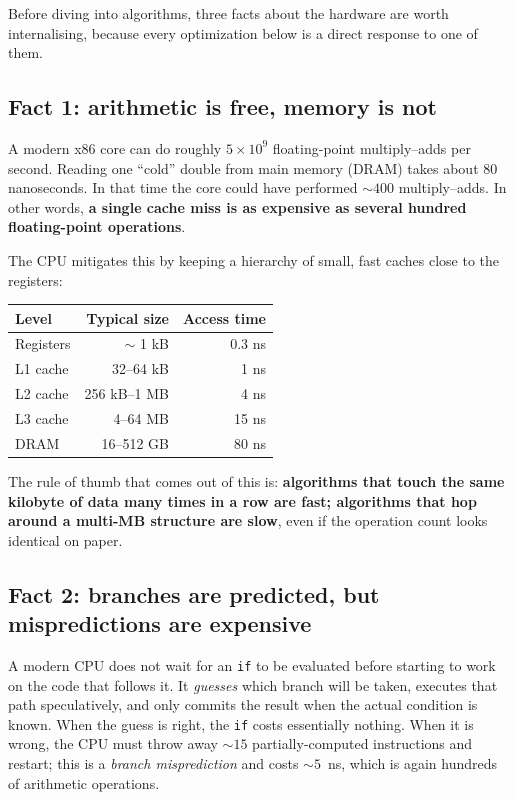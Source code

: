 \documentclass[11pt,letterpaper]{article}
\begin{document}
Before diving into algorithms, three facts about the hardware are worth
internalising, because every optimization below is a direct response to
one of them.

\subsection{Fact 1: arithmetic is free, memory is not}
A modern x86 core can do roughly $5 \times 10^{9}$ floating-point
multiply--adds per second.  Reading one ``cold'' double from main memory
(DRAM) takes about $80$ nanoseconds.  In that time the core could have
performed $\sim 400$ multiply--adds.  In other words, \textbf{a single
cache miss is as expensive as several hundred floating-point operations}.

The CPU mitigates this by keeping a hierarchy of small, fast caches close
to the registers:
\begin{center}
\begin{tabular}{lrr}
\toprule
Level & Typical size & Access time \\
\midrule
Registers      & $\sim$ 1 kB   & 0.3 ns  \\
L1 cache       & 32--64 kB     & 1   ns  \\
L2 cache       & 256 kB--1 MB  & 4   ns  \\
L3 cache       & 4--64 MB      & 15  ns  \\
DRAM           & 16--512 GB    & 80  ns  \\
\bottomrule
\end{tabular}
\end{center}

The rule of thumb that comes out of this is: \textbf{algorithms that
touch the same kilobyte of data many times in a row are fast; algorithms
that hop around a multi-MB structure are slow}, even if the operation
count looks identical on paper.

\subsection{Fact 2: branches are predicted, but mispredictions are expensive}
A modern CPU does not wait for an \texttt{if} to be evaluated before
starting to work on the code that follows it.  It \emph{guesses} which
branch will be taken, executes that path speculatively, and only commits
the result when the actual condition is known.  When the guess is right,
the \texttt{if} costs essentially nothing.  When it is wrong, the CPU
must throw away $\sim 15$ partially-computed instructions and restart;
this is a \emph{branch misprediction} and costs $\sim 5$~ns, which is
again hundreds of arithmetic operations.
\end{document}
